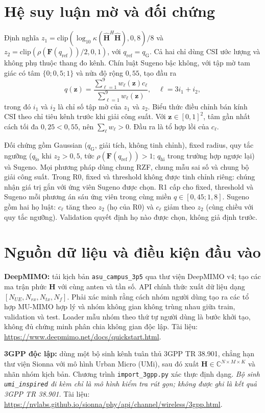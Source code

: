 \documentclass[11pt,onecolumn]{IEEEtran}
\begin{document}
\section{Hệ suy luận mờ và đối chứng}
Định nghĩa $z_1=\mathrm{clip}(\log_{10}\kappa(\widehat{\mathbf H}^H\widehat{\mathbf H}),0,8)/8$ và $z_2=\mathrm{clip}(\rho(\mathbf F(q_{\mathrm{ref}}))/2,0,1)$, với $q_{\mathrm{ref}}=q_{\mathrm G}$. Cả hai chỉ dùng CSI ước lượng và không phụ thuộc thang đo kênh. Chín luật Sugeno bậc không, với tập mờ tam giác có tâm $\{0;0{,}5;1\}$ và nửa độ rộng $0{,}55$, tạo đầu ra
\begin{equation}
q(\mathbf z)=\frac{\sum_{\ell=1}^{9} w_\ell(\mathbf z)c_\ell}{\sum_{\ell=1}^{9}w_\ell(\mathbf z)},\quad \ell=3i_1+i_2,
\end{equation}
trong đó $i_1$ và $i_2$ là chỉ số tập mờ của $z_1$ và $z_2$. Biểu thức điều chỉnh bán kính CSI theo chỉ tiêu kênh trước khi giải công suất. Với $\mathbf z\in[0,1]^2$, tâm gần nhất cách tối đa $0{,}25<0{,}55$, nên $\sum_\ell w_\ell>0$. Đầu ra là tổ hợp lồi của $c_\ell$.

Đối chứng gồm Gaussian ($q_{\mathrm G}$, giải tích, không tinh chỉnh), fixed radius, quy tắc ngưỡng ($q_{\mathrm{lo}}$ khi $z_2>0{,}5$, tức $\rho(\mathbf F(q_{\mathrm{ref}}))>1$; $q_{\mathrm{hi}}$ trong trường hợp ngược lại) và Sugeno. Mọi phương pháp dùng chung RZF, chung mẫu sai số và chung bộ giải công suất. Trong R0, fixed và threshold không được tinh chỉnh riêng: chúng nhận giá trị gắn với ứng viên Sugeno được chọn. R1 cấp cho fixed, threshold và Sugeno mỗi phương án sáu ứng viên trong cùng miền $q\in[0{,}45;1{,}8]$. Sugeno gồm hai họ luật: $c_\ell$ tăng theo $z_2$ (họ của R0) và $c_\ell$ giảm theo $z_2$ (cùng chiều với quy tắc ngưỡng). Validation quyết định họ nào được chọn, không giả định trước.
\section{Nguồn dữ liệu và điều kiện đầu vào}
\textbf{DeepMIMO:} tải kịch bản \texttt{asu\_campus\_3p5} qua thư viện DeepMIMO v4; tạo các ma trận phức $\mathbf H$ với cùng anten và tần số. API chính thức xuất dữ liệu dạng $[N_{UE},N_{rx},N_{tx},N_f]$. Phải xác minh rằng cách nhóm người dùng tạo ra các tổ hợp MU-MIMO hợp lý và nhóm không gian không trùng nhau giữa train, validation và test. Loader mẫu nhóm theo thứ tự người dùng là bước khởi tạo, không đủ chứng minh phân chia không gian độc lập. Tài liệu: \url{https://www.deepmimo.net/docs/quickstart.html}.

\textbf{3GPP độc lập:} dùng một bộ sinh kênh tuân thủ 3GPP TR 38.901, chẳng hạn thư viện Sionna với mô hình Urban Micro (UMi), sau đó xuất $\mathbf H\in\mathbb C^{N\times M\times K}$ và nhãn nhóm kịch bản. Chương trình \texttt{import\_3gpp.py} xác thực định dạng. \textit{Bộ sinh \texttt{umi\_inspired} đi kèm chỉ là mô hình kiểm tra rút gọn; không được ghi là kết quả 3GPP TR 38.901.} Tài liệu: \url{https://nvlabs.github.io/sionna/phy/api/channel/wireless/3gpp.html}.
\end{document}
